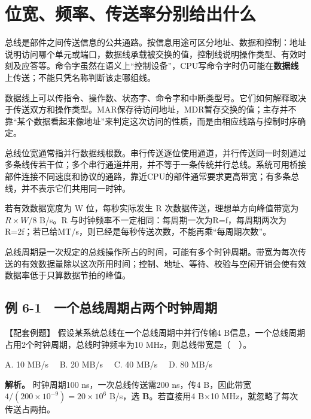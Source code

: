 \section{位宽、频率、传送率分别给出什么}\label{CO06-metrics}

总线是部件之间传送信息的公共通路。按信息用途可区分地址、数据和控制：地址说明访问哪个单元或端口，数据线承载被交换的值，控制线说明操作类型、有效时刻及应答等。命令字虽然在语义上``控制设备''，CPU写命令字时仍可能在\textbf{数据线}上传送；不能只凭名称判断该走哪组线。

数据线上可以传指令、操作数、状态字、命令字和中断类型号。它们如何解释取决于传送双方和操作类型。MAR保存待访问地址，MDR暂存交换的值；主存并不靠``某个数据看起来像地址''来判定这次访问的性质，而是由相应线路与控制时序确定。

总线位宽通常指并行数据线根数。串行传送逐位使用通道，并行传送同一时刻通过多条线传若干位；多个串行通道并用，并不等于一条传统并行总线。系统可用桥接部件连接不同速度和协议的通路，靠近CPU的部件通常要求更高带宽；有多条总线，并不表示它们共用同一时钟。

{\begin{methodbox}[带宽先写每次字节数与每秒次数]

若有效数据宽度为 W 位，每秒实际发生 R 次数据传送，理想单方向峰值带宽为 \(R\times W/8\) B/s。R 与时钟频率不一定相同：每周期一次为R=f，每周期两次为R=2f；若已给MT/s，则已经是每秒传送次数，不能再乘``每周期次数''。

总线周期是一次规定的总线操作所占的时间，可能有多个时钟周期。带宽为每次传送的有效数据量除以这次所用时间；控制、地址、等待、校验与空闲开销会使有效数据率低于只算数据节拍的峰值。

\end{methodbox}}

\subsection{例 6-1　一个总线周期占两个时钟周期}\label{CO06-example-1}

【配套例题】 假设某系统总线在一个总线周期中并行传输4 B信息，一个总线周期占用2个时钟周期，总线时钟频率为10 MHz，则总线带宽是（　）。

A. 10 MB/s　 B. 20 MB/s　 C. 40 MB/s　 D. 80 MB/s

\textbf{解析。} 时钟周期100 ns，一次总线传送需200 ns，传4 B，因此带宽 \(4/(200\times10^{-9})=20\times10^6\) B/s，选 \textbf{B}。若直接用4 B\ensuremath{\times}10 MHz，就忽略了每次传送占两拍。

